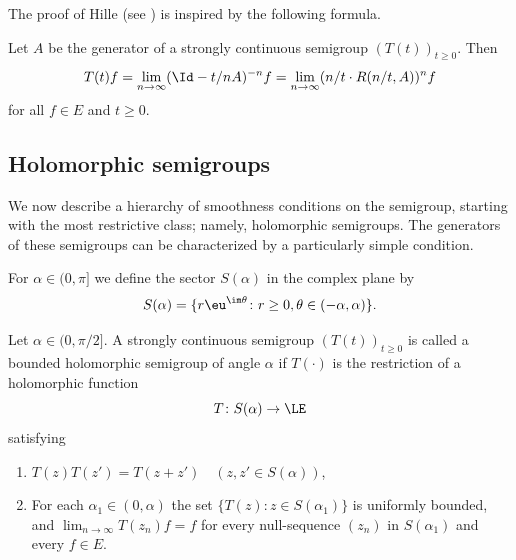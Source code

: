 The proof of Hille (see \textcite{kato:1976}) is inspired by the following formula.
\begin{proposition}\label{prop:a2-1.10}
Let $A$ be the generator of a strongly continuous semigroup $(T(t))_{t \geq 0}$.
Then
\begin{equation}\label{eq:a2-1.3}
    T(t)f = \lim_{n \to \infty} (\Id - t/nA)^{-n} f = \lim_{n \to \infty} (n/t \cdot R(n/t,A))^{n} f
\end{equation}
for all $f \in E$ and $t \geq 0$.
\end{proposition}
\subsection{Holomorphic semigroups} \label{subsec:a2-1.se4}%
We now describe a hierarchy of smoothness conditions on the semigroup, starting with the most restrictive class; namely, holomorphic semigroups.
The generators of these semigroups can be characterized by a particularly simple condition.

For $\alpha \in (0,\pi]$ we define the sector $S(\alpha)$ in the complex plane by
\[
    S(\alpha) = \{r\eu^{\im\theta} \colon r \geq 0, \theta \in (-\alpha,\alpha)\} .
\]

\begin{definition}\label{def:a2-1.11}
Let $\alpha \in (0,\pi/2]$.
A strongly continuous semigroup $(T(t))_{t \geq 0}$ is called a bounded holomorphic semigroup of angle $\alpha$ if\/ $T(\cdot)$ is the restriction of a holomorphic function
\[
    T \colon S(\alpha) \to \LE
\]
satisfying
\begin{enumerate}[\upshape(i), wide, labelindent=.25em]

\item
$T(z)T(z') = T(z+z') \quad (z,z' \in S(\alpha))$,

\item
For each  $ \alpha_{1} \in (0,\alpha) $  the set   
$ \{ T(z) \colon z \in S(\alpha_{1}) \} $
is uniformly bounded, and  
$\lim_{n \to \infty} T(z_{n})f = f$ 
for every null-sequence  $(z_{n})$ 
in  $ S( \alpha_{1} ) $  and every   $f \in E$.

\end{enumerate}
\end{definition}

